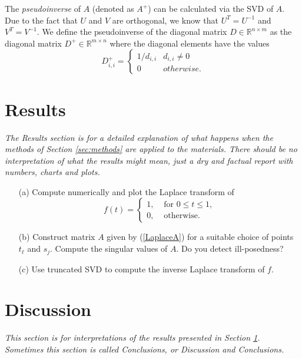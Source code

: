 \documentclass[12pt,a4]{article}
\newcommand{\R}{{\mathbb R}}
\begin{document}
The \emph{pseudoinverse} of $A$ (denoted as $A^+$) can be calculated via the SVD of $A$. Due to the fact that $U$ and $V$ are orthogonal, we know that $U^T = U^{-1}$ and $V^T = V^{-1}$. We define the pseudoinverse of the diagonal matrix $D \in \R^{n \times m}$ as the diagonal matrix $D^+ \in \R^{m \times n}$ where the diagonal elements have the values
\begin{equation}
D^+_{i,i} =
\begin{cases}
    1 / d_{i,i} & d_{i,i} \neq 0 \\
    0           & otherwise.
\end{cases}
\end{equation}


\section{Results}\label{sec:results}

{\em The Results section is for a detailed explanation of what happens when the methods of Section \ref{sec:methods} are applied to the materials. There should be no interpretation of what the results might mean, just a dry and factual report with numbers, charts and plots.}


\begin{itemize}
\item[(a)] Compute numerically and plot the Laplace transform of 
$$
  f(t) = \left\{\begin{array}{ll}1,&\mbox{ for }0\leq t \leq 1,\\0, &\mbox{ otherwise.}\end{array}\right.
$$

\item[(b)] Construct matrix $A$ given by (\ref{LaplaceA}) for a suitable choice of points $t_\ell$ and $s_j$. Compute the singular values of $A$. Do you detect ill-posedness?

\item[(c)] Use truncated SVD to compute the inverse Laplace transform of $f$.
\end{itemize}


\section{Discussion}

{\em This section is for interpretations of the results presented in Section \ref{sec:results}. Sometimes this section is called Conclusions, or Discussion and Conclusions.}
\end{document}

